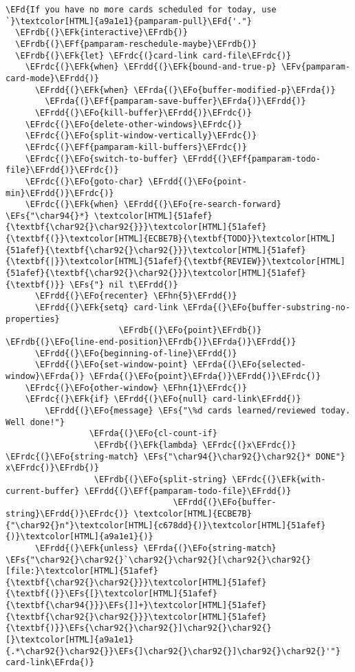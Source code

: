 \documentclass[a4wide,10pt]{article}
\newcommand{\EFs}[1]{\textcolor{EFs}{#1}} %
\newcommand{\EFd}[1]{\textcolor{EFd}{#1}} %
\newcommand{\EFk}[1]{\textcolor{EFk}{#1}} %
\newcommand{\EFf}[1]{\textcolor{EFf}{#1}} %
\newcommand{\EFv}[1]{\textcolor{EFv}{#1}} %
\newcommand{\EFo}[1]{\textcolor{EFo}{#1}} %
\newcommand{\EFhn}[1]{\textcolor{EFhn}{\textbf{#1}}} %
\newcommand{\EFrda}[1]{\textcolor{EFrda}{#1}} %
\newcommand{\EFrdb}[1]{\textcolor{EFrdb}{#1}} %
\newcommand{\EFrdc}[1]{\textcolor{EFrdc}{#1}} %
\newcommand{\EFrdd}[1]{\textcolor{EFrdd}{#1}} %
\begin{document}
\begin{Code}
\begin{Verbatim}
\EFd{If you have no more cards scheduled for today, use `}\textcolor[HTML]{a9a1e1}{pamparam-pull}\EFd{'."}
  \EFrdb{(}\EFk{interactive}\EFrdb{)}
  \EFrdb{(}\EFf{pamparam-reschedule-maybe}\EFrdb{)}
  \EFrdb{(}\EFk{let} \EFrdc{(}card-link card-file\EFrdc{)}
    \EFrdc{(}\EFk{when} \EFrdd{(}\EFk{bound-and-true-p} \EFv{pamparam-card-mode}\EFrdd{)}
      \EFrdd{(}\EFk{when} \EFrda{(}\EFo{buffer-modified-p}\EFrda{)}
        \EFrda{(}\EFf{pamparam-save-buffer}\EFrda{)}\EFrdd{)}
      \EFrdd{(}\EFo{kill-buffer}\EFrdd{)}\EFrdc{)}
    \EFrdc{(}\EFo{delete-other-windows}\EFrdc{)}
    \EFrdc{(}\EFo{split-window-vertically}\EFrdc{)}
    \EFrdc{(}\EFf{pamparam-kill-buffers}\EFrdc{)}
    \EFrdc{(}\EFo{switch-to-buffer} \EFrdd{(}\EFf{pamparam-todo-file}\EFrdd{)}\EFrdc{)}
    \EFrdc{(}\EFo{goto-char} \EFrdd{(}\EFo{point-min}\EFrdd{)}\EFrdc{)}
    \EFrdc{(}\EFk{when} \EFrdd{(}\EFo{re-search-forward} \EFs{"\char94{}*} \textcolor[HTML]{51afef}{\textbf{\char92{}\char92{}}}\textcolor[HTML]{51afef}{\textbf{(}}\textcolor[HTML]{ECBE7B}{\textbf{TODO}}\textcolor[HTML]{51afef}{\textbf{\char92{}\char92{}}}\textcolor[HTML]{51afef}{\textbf{|}}\textcolor[HTML]{51afef}{\textbf{REVIEW}}\textcolor[HTML]{51afef}{\textbf{\char92{}\char92{}}}\textcolor[HTML]{51afef}{\textbf{)}} \EFs{"} nil t\EFrdd{)}
      \EFrdd{(}\EFo{recenter} \EFhn{5}\EFrdd{)}
      \EFrdd{(}\EFk{setq} card-link \EFrda{(}\EFo{buffer-substring-no-properties}
                       \EFrdb{(}\EFo{point}\EFrdb{)} \EFrdb{(}\EFo{line-end-position}\EFrdb{)}\EFrda{)}\EFrdd{)}
      \EFrdd{(}\EFo{beginning-of-line}\EFrdd{)}
      \EFrdd{(}\EFo{set-window-point} \EFrda{(}\EFo{selected-window}\EFrda{)} \EFrda{(}\EFo{point}\EFrda{)}\EFrdd{)}\EFrdc{)}
    \EFrdc{(}\EFo{other-window} \EFhn{1}\EFrdc{)}
    \EFrdc{(}\EFk{if} \EFrdd{(}\EFo{null} card-link\EFrdd{)}
        \EFrdd{(}\EFo{message} \EFs{"\%d cards learned/reviewed today. Well done!"}
                 \EFrda{(}\EFo{cl-count-if}
                  \EFrdb{(}\EFk{lambda} \EFrdc{(}x\EFrdc{)} \EFrdc{(}\EFo{string-match} \EFs{"\char94{}\char92{}\char92{}* DONE"} x\EFrdc{)}\EFrdb{)}
                  \EFrdb{(}\EFo{split-string} \EFrdc{(}\EFk{with-current-buffer} \EFrdd{(}\EFf{pamparam-todo-file}\EFrdd{)}
                                  \EFrdd{(}\EFo{buffer-string}\EFrdd{)}\EFrdc{)} \textcolor[HTML]{ECBE7B}{"\char92{}n"}\textcolor[HTML]{c678dd}{)}\textcolor[HTML]{51afef}{)}\textcolor[HTML]{a9a1e1}{)}
      \EFrdd{(}\EFk{unless} \EFrda{(}\EFo{string-match} \EFs{"\char92{}\char92{}`\char92{}\char92{}[\char92{}\char92{}[file:}\textcolor[HTML]{51afef}{\textbf{\char92{}\char92{}}}\textcolor[HTML]{51afef}{\textbf{(}}\EFs{[}\textcolor[HTML]{51afef}{\textbf{\char94{}}}\EFs{]]+}\textcolor[HTML]{51afef}{\textbf{\char92{}\char92{}}}\textcolor[HTML]{51afef}{\textbf{)}}\EFs{\char92{}\char92{}]\char92{}\char92{}[}\textcolor[HTML]{a9a1e1}{.*\char92{}\char92{}}\EFs{]\char92{}\char92{}]\char92{}\char92{}'"} card-link\EFrda{)}

\end{Verbatim}
\end{Code}
\end{document}

